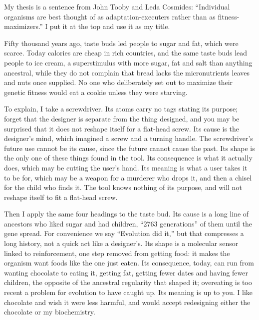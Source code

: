 
My thesis is a sentence from John Tooby and Leda Cosmides: ``Individual organisms are best thought of as adaptation-executers rather than as fitness-maximizers.'' I put it at the top and use it as my title.

Fifty thousand years ago, taste buds led people to sugar and fat, which were scarce. Today calories are cheap in rich countries, and the same taste buds lead people to ice cream, a superstimulus with more sugar, fat and salt than anything ancestral, while they do not complain that bread lacks the micronutrients leaves and nuts once supplied. No one who deliberately set out to maximize their genetic fitness would eat a cookie unless they were starving. 

To explain, I take a screwdriver. Its atoms carry no tags stating its purpose; forget that the designer is separate from the thing designed, and you may be surprised that it does not reshape itself for a flat-head screw. Its cause is the designer's mind, which imagined a screw and a turning handle. The screwdriver's future use cannot be its cause, since the future cannot cause the past. Its shape is the only one of these things found in the tool. Its consequence is what it actually does, which may be cutting the user's hand. Its meaning is what a user takes it to be for, which may be a weapon for a murderer who drops it, and then a chisel for the child who finds it. The tool knows nothing of its purpose, and will not reshape itself to fit a flat-head screw.

Then I apply the same four headings to the taste bud. Its cause is a long line of ancestors who liked sugar and had children, ``2763 generations'' of them until the gene spread.  For convenience we say ``Evolution did it,'' but that compresses a long history, not a quick act like a designer's. Its shape is a molecular sensor linked to reinforcement, one step removed from getting food: it makes the organism want foods like the one just eaten. Its consequence, today, can run from wanting chocolate to eating it, getting fat, getting fewer dates and having fewer children, the opposite of the ancestral regularity that shaped it; overeating is too recent a problem for evolution to have caught up. Its meaning is up to you. I like chocolate and wish it were less harmful, and would accept redesigning either the chocolate or my biochemistry. 

